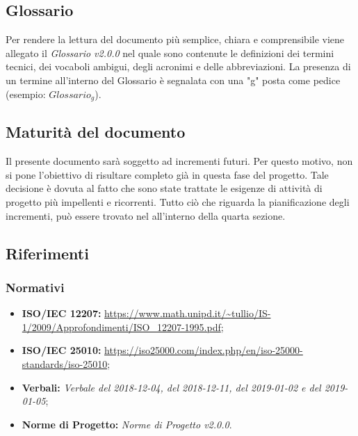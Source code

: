 \subsection{Glossario}
Per rendere la lettura del documento più semplice, chiara e comprensibile viene allegato il \emph{Glossario v2.0.0} nel quale sono contenute le definizioni dei termini tecnici, dei vocaboli ambigui, degli acronimi e delle abbreviazioni. La presenza di un termine all'interno del Glossario è segnalata con una "g" posta come pedice (esempio: $Glossario_{g}$).
\subsection{Maturità del documento}
Il presente documento sarà soggetto ad incrementi futuri. Per questo motivo, non si pone l'obiettivo di risultare completo già in questa fase del progetto.
Tale decisione è dovuta al fatto che sono state trattate le esigenze di attività di progetto più impellenti e ricorrenti.
Tutto ciò che riguarda la pianificazione degli incrementi, può essere trovato nel \emph{} all'interno della quarta sezione.  
\subsection{Riferimenti}

\subsubsection{Normativi}
\begin{itemize}
	\item \textbf{ISO/IEC 12207:} \url{https://www.math.unipd.it/~tullio/IS-1/2009/Approfondimenti/ISO_12207-1995.pdf};
	\item \textbf{ISO/IEC 25010:} \url{https://iso25000.com/index.php/en/iso-25000-standards/iso-25010};
	\item \textbf{Verbali:} \emph{Verbale del 2018-12-04, del 2018-12-11, del 2019-01-02 e del 2019-01-05};
	\item \textbf{Norme di Progetto:} \emph{Norme di Progetto v2.0.0}.
\end{itemize}
